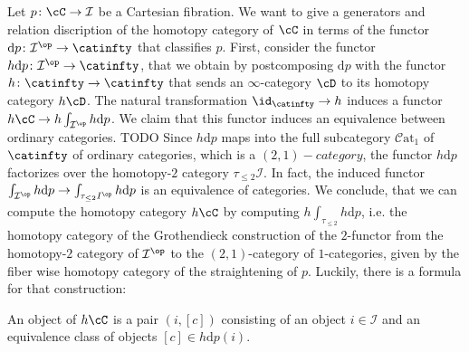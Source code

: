   \begin{remark}
  Let $p \colon \cC \to \mathcal I$ be a Cartesian fibration. We want to give a generators and 
  relation discription 
  of the homotopy category of $\cC$ in terms of the functor ${\mathrm{d}} p \colon \mathcal I^\op \to \catinfty$ that 
  classifies $p$. 
  First, consider the functor $h {\mathrm{d}} p \colon \mathcal I^\op \to \catinfty$, that 
  we obtain by postcomposing ${\mathrm{d}} p$ with the functor $h \colon \catinfty \to \catinfty$
  that sends an $\infty$-category $\cD$ to its homotopy category $h\cD$.
  The natural transformation $\id_{\catinfty} \to h$ induces a functor 
  $h\cC \to h\int_{\mathcal I^\op} h {\mathrm{d}} p$.
  We claim that this functor induces an equivalence between ordinary categories.
  TODO 
  Since $h {\mathrm{d}} p$ maps into the full subcategory $\mathcal{C}\mathrm{at}_1$ of 
  $\catinfty$ of ordinary categories, which is a $(2,1)-category$, the functor $h {\mathrm{d}} p$
  factorizes over the homotopy-$2$ category $\tau_{\leq 2} \mathcal I$. 
  In fact, the induced functor $\int_{\mathcal I^\op} h {\mathrm{d}} p 
  \to \int_{\mathcal \tau_{\leq 2}I^\op} h {\mathrm{d}} p $ is an 
  equivalence of categories.
  We conclude, that we can compute the homotopy category $h\cC$ by computing 
  $h \int_{\tau_{\leq 2}} h {\mathrm{d}} p$, i.e. the homotopy category 
  of the Grothendieck construction of the $2$-functor from the homotopy-$2$ category of 
  $\mathcal I^\op$ to the $(2,1)$-category of $1$-categories, given by the 
  fiber wise homotopy category of the straightening of $p$. 
  Luckily, there is a formula for that construction:
  
  An object of $h\cC$ is a pair $(i, [c])$ consisting of an object $i \in \mathcal I$
  and an equivalence class of objects $[c] \in h {\mathrm{d}} p(i)$.
  

\end{remark}
